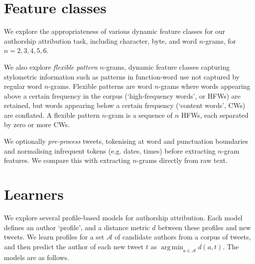 \documentclass[twocolumn,10pt]{article}
\DeclareMathOperator*{\argmin}{arg\,min}
\begin{document}
\section{Feature classes}
We explore the appropriateness of various dynamic feature
classes for our authorship attribution task, including
character, byte, and word $n$-grams, for $n = 2,3,4,5,6$.

We also explore \emph{flexible pattern} $n$-grams, dynamic
feature classes capturing stylometric information such as
patterns in function-word use not captured by regular word 
$n$-grams\supercite{schwartz2013authorship}.
Flexible patterns are word $n$-grams where words appearing
above a certain frequency in the corpus (`high-frequency words',
or HFWs) are retained, but words appearing below a certain
frequency (`content words', CWs) are conflated. A flexible
pattern $n$-gram is a sequence of $n$ HFWs, each separated
by zero or more CWs.


We optionally \emph{pre-process} tweets,
tokenising at word and punctuation boundaries and
normalising infrequent tokens (e.g. dates, times)
before extracting $n$-gram features.
We compare this with extracting $n$-grams directly from
raw text.


\section{Learners}

We explore several profile-based models for authorship attribution.
Each model defines an author  `profile', and a distance metric $d$
between these profiles and new tweets.
We learn profiles for a set $\mathcal{A}$ of candidate authors from
a corpus of tweets, and then predict the author of each new tweet
$t$ as $\argmin_{a \in \mathcal{A}} d(a, t)$.
The models are as follows.
\end{document}
